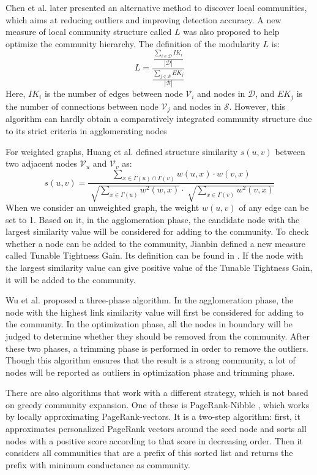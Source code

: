 \documentclass[\main/thesis.tex]{subfiles}
\begin{document}
Chen et al. \cite{chen2009local} later presented an alternative method to discover local communities, which aims at reducing outliers and improving detection accuracy. A new measure of local community structure called $L$ was also proposed to help optimize the community hierarchy. The definition of the modularity $L$ is:
\begin{equation}
L=\frac{\frac{\sum_{i\in \mathcal{D}}IK_i}{|\mathcal{D}|}}{\frac{\sum_{j\in \mathcal{B}}EK_j}{|\mathcal{B}|}}
\end{equation}
Here, $IK_i$ is the number of edges between node $\mathcal{V}_i$ and nodes in $\mathcal{D}$, and $EK_j$ is the number of connections between node $\mathcal{V}_j$ and nodes in $\mathcal{S}$. However, this algorithm can hardly obtain a comparatively integrated community structure due to its strict criteria in agglomerating nodes

For weighted graphs, Huang et al. \cite{huang2011towards} defined structure similarity $s(u,v)$ between two adjacent nodes $\mathcal{V}_u$ and $\mathcal{V}_v$ as:
\begin{equation}
s(u,v)=\frac{\sum_{x\in \Gamma(u)\cap\Gamma(v)}w(u,x)\cdot w(v,x)}{\sqrt[]{\sum_{x\in \Gamma(u)}w^2(w,x)}\cdot\sqrt[]{\sum_{x\in \Gamma(v)}w^2(v,x)}}
\end{equation}
When we consider an unweighted graph, the weight $w(u,v)$ of any edge can be set to 1. Based on it, in the agglomeration phase, the candidate node with the largest similarity value will be considered for adding to the community. To check whether a node can be added to the community, Jianbin defined a new measure called Tunable Tightness Gain. Its definition can be found in \cite{huang2011towards}. If the node with the largest similarity value can give positive value of the Tunable Tightness Gain, it will be added to the community.

Wu et al. \cite{wu2012local} proposed a three-phase algorithm. In the agglomeration phase, the node with the highest link similarity value will first be considered for adding to the community. In the optimization phase, all the nodes in boundary will be judged to determine whether they should be removed from the community. After these two phases, a trimming phase is performed in order to remove the outliers. Though this algorithm ensures that the result is a strong community, a lot of nodes will be reported as outliers in optimization phase and trimming phase.

There are also algorithms that work with a different strategy, which is not based on greedy community expansion. One of these is PageRank-Nibble \cite{andersen2006local}, which works by locally approximating PageRank-vectors. It is a two-step algorithm: first, it approximates personalized PageRank vectors around the seed node and sorts all nodes with a positive score according to that score in decreasing order. Then it considers all communities that are a prefix of this sorted list and returns the prefix with minimum conductance as community.
\end{document}
